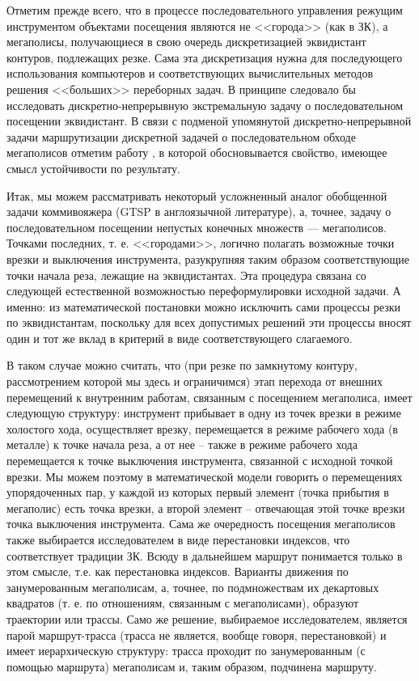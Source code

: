 \documentclass[11pt,twoside,openany]{report}
\begin{document}
Отметим прежде всего, что в процессе последовательного управления режущим инструментом объектами посещения являются не <<города>> (как в ЗК), а мегаполисы, получающиеся в свою очередь дискретизацией эквидистант контуров, подлежащих резке. Сама эта дискретизация нужна для последующего использования компьютеров и соответствующих вычислительных методов решения <<больших>> переборных задач. В принципе следовало бы исследовать дискретно-непрерывную экстремальную задачу о последовательном посещении эквидистант. В связи с подменой упомянутой дискретно-непрерывной задачи маршрутизации дискретной задачей о последовательном обходе мегаполисов отметим работу \cite{intro01}, в которой обосновывается свойство, имеющее смысл устойчивости по результату.

Итак, мы можем рассматривать некоторый усложненный аналог обобщенной задачи коммивояжера (GTSP в англоязычной литературе), а, точнее, задачу о последовательном посещении непустых конечных множеств — мегаполисов. Точками последних, т. е. <<городами>>, логично полагать возможные точки врезки и выключения инструмента, разукрупняя таким образом соответствующие точки начала реза, лежащие на эквидистантах. Эта процедура связана со следующей естественной возможностью переформулировки исходной задачи. А именно: из математической постановки можно исключить сами процессы резки по эквидистантам, поскольку для всех допустимых решений эти процессы вносят один и тот же вклад в критерий в виде соответствующего слагаемого.

В таком случае можно считать, что (при резке по замкнутому контуру, рассмотрением которой мы здесь и ограничимся) этап перехода от внешних перемещений к внутренним работам, связанным с посещением мегаполиса, имеет следующую структуру: инструмент прибывает в одну из точек врезки в режиме холостого хода, осуществляет врезку, перемещается в режиме рабочего хода (в металле) к точке начала реза, а от нее – также в режиме рабочего хода перемещается к точке выключения инструмента, связанной с исходной точкой врезки. Мы можем поэтому в математической модели говорить о перемещениях упорядоченных пар, у каждой из которых первый элемент (точка прибытия в мегаполис) есть точка врезки, а второй элемент – отвечающая этой точке врезки точка выключения инструмента. Сама же очередность посещения мегаполисов также выбирается исследователем в виде перестановки индексов, что соответствует традиции ЗК. Всюду в дальнейшем маршрут понимается только в этом смысле, т.е. как перестановка индексов. Варианты движения по занумерованным мегаполисам, а, точнее, по подмножествам их декартовых квадратов (т. е. по отношениям, связанным с мегаполисами), образуют траектории или трассы. Само же решение, выбираемое исследователем, является парой маршрут-трасса (трасса не является, вообще говоря, перестановкой) и имеет иерархическую структуру: трасса проходит по занумерованным (с помощью маршрута) мегаполисам и, таким образом, подчинена маршруту.
\end{document}
